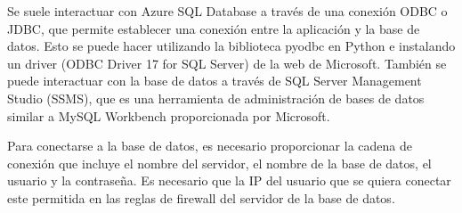Se suele interactuar con Azure SQL Database a través de una conexión ODBC o JDBC, que permite establecer una conexión entre la aplicación y la base de datos. 
Esto se puede hacer utilizando la biblioteca pyodbc en Python e instalando un driver (ODBC Driver 17 for SQL Server) de la web de Microsoft. 
También se puede interactuar con la base de datos a través de SQL Server Management Studio (SSMS), que es una herramienta de administración de bases de datos similar a MySQL Workbench proporcionada por Microsoft.

Para conectarse a la base de datos, es necesario proporcionar la cadena de conexión que incluye el nombre del servidor, el nombre de la base de datos, el usuario y la contraseña.
Es necesario que la IP del usuario que se quiera conectar este permitida en las reglas de firewall del servidor de la base de datos.